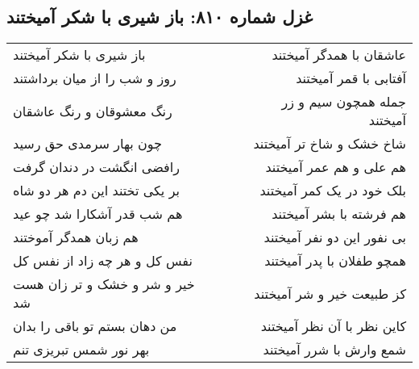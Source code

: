 \begin{center}
\section*{غزل شماره ۸۱۰: باز شیری با شکر آمیختند}
\label{sec:0810}
\begin{longtable}{l p{0.5cm} r}
باز شیری با شکر آمیختند
&&
عاشقان با همدگر آمیختند
\\
روز و شب را از میان برداشتند
&&
آفتابی با قمر آمیختند
\\
رنگ معشوقان و رنگ عاشقان
&&
جمله همچون سیم و زر آمیختند
\\
چون بهار سرمدی حق رسید
&&
شاخ خشک و شاخ تر آمیختند
\\
رافضی انگشت در دندان گرفت
&&
هم علی و هم عمر آمیختند
\\
بر یکی تختند این دم هر دو شاه
&&
بلک خود در یک کمر آمیختند
\\
هم شب قدر آشکارا شد چو عید
&&
هم فرشته با بشر آمیختند
\\
هم زبان همدگر آموختند
&&
بی نفور این دو نفر آمیختند
\\
نفس کل و هر چه زاد از نفس کل
&&
همچو طفلان با پدر آمیختند
\\
خیر و شر و خشک و تر زان هست شد
&&
کز طبیعت خیر و شر آمیختند
\\
من دهان بستم تو باقی را بدان
&&
کاین نظر با آن نظر آمیختند
\\
بهر نور شمس تبریزی تنم
&&
شمع وارش با شرر آمیختند
\\
\end{longtable}
\end{center}
